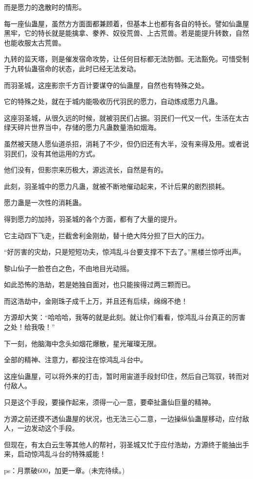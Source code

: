 \begin{this_body}
而是愿力的逸散时的情形。

每一座仙蛊屋，虽然方方面面都兼顾着，但基本上也都有各自的特长。譬如仙蛊屋黑牢，它的特长就是能擒拿、豢养、奴役荒兽、上古荒兽。若是能提升转数，自然也能收服太古荒兽。

九转的监天塔，则是催发宿命攻势，让任何目标都无法防御。无法豁免。可惜受制于九转仙蛊宿命的状态，此时已经无法发动。

而羽圣城，这座影宗千方百计要谋夺的仙蛊屋，自然也有特殊之处。

它的特殊之处，就在于城内能吸收历代羽民的愿力，自动炼成愿力凡蛊。

这座羽圣城，从很久远的时候，就被羽民们占据。羽民们一代又一代，生活在太古绿天碎片世界当中，存储的愿力凡蛊数量浩如烟海。

虽然被天随人愿仙道杀招，消耗了不少，但仍旧还有大半，没有来得及用。或者说羽民们，没有其他运用的方式。

他们没有，但影宗来历极大，源远流长，自然是有的。

此刻，羽圣城中的愿力凡蛊，就被不断地催动起来，不计后果的剧烈损耗。

愿力蛊是一次性的消耗蛊。

得到愿力的加持，羽圣城的各个方面，都有了大量的提升。

它主动四下飞走，拦截舍利金刚劫，替十绝大阵分担了巨大的压力。

“好厉害的灾劫，只是短短功夫，惊鸿乱斗台要支撑不下去了。”黑楼兰惊呼出声。

黎山仙子一脸苍白之色，不由地目光动摇。

如此恐怖的浩劫，若是她独自面对，也只能挨得过两三颗而已。

而这浩劫中，金刚珠子成千上万，并且还有后续，绵绵不绝！

方源却大笑：“哈哈哈，我等的就是此刻。就让你们看看，惊鸿乱斗台真正的厉害之处！给我吸！”

下一刻，他脑海中念头如烟花爆散，星光璀璨无限。

全部的精神、注意力，都投注在惊鸿乱斗台中。

这座仙蛊屋，可以将外来的打击，暂时用宙道手段封印住，然后自己驾驭，转而对付敌人。

只是这个手段，要操作起来，须得一心一意，要牵扯蛊仙巨量的精神。

方源之前还摸不透仙蛊屋的状况，也无法三心二意，一边操纵仙蛊屋移动，应付敌人，一边发动这个手段。

但现在，有太白云生等其他人的帮衬，羽圣城又忙于应付浩劫，方源终于能抽出手来，启动惊鸿乱斗台的特殊威能！

ps：月票破600，加更一章。(未完待续。)

\end{this_body}

